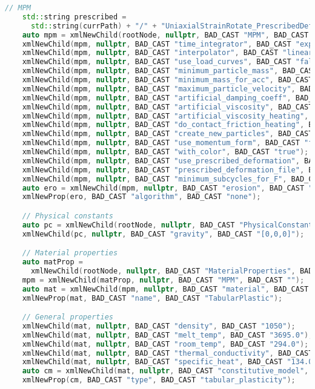 \begin{enumerate}
\begin{lstlisting}[language=Cpp]
    // MPM
    std::string prescribed = 
      std::string(currPath) + "/" + "UniaxialStrainRotate_PrescribedDeformation.inp";
    auto mpm = xmlNewChild(rootNode, nullptr, BAD_CAST "MPM", BAD_CAST "");
    xmlNewChild(mpm, nullptr, BAD_CAST "time_integrator", BAD_CAST "explicit");
    xmlNewChild(mpm, nullptr, BAD_CAST "interpolator", BAD_CAST "linear");
    xmlNewChild(mpm, nullptr, BAD_CAST "use_load_curves", BAD_CAST "false");
    xmlNewChild(mpm, nullptr, BAD_CAST "minimum_particle_mass", BAD_CAST "1.0e-15");
    xmlNewChild(mpm, nullptr, BAD_CAST "minimum_mass_for_acc", BAD_CAST "1.0e-15");
    xmlNewChild(mpm, nullptr, BAD_CAST "maximum_particle_velocity", BAD_CAST "1.0e5");
    xmlNewChild(mpm, nullptr, BAD_CAST "artificial_damping_coeff", BAD_CAST "0.0");
    xmlNewChild(mpm, nullptr, BAD_CAST "artificial_viscosity", BAD_CAST "true");
    xmlNewChild(mpm, nullptr, BAD_CAST "artificial_viscosity_heating", BAD_CAST "false");
    xmlNewChild(mpm, nullptr, BAD_CAST "do_contact_friction_heating", BAD_CAST "false");
    xmlNewChild(mpm, nullptr, BAD_CAST "create_new_particles", BAD_CAST "false");
    xmlNewChild(mpm, nullptr, BAD_CAST "use_momentum_form", BAD_CAST "false");
    xmlNewChild(mpm, nullptr, BAD_CAST "with_color", BAD_CAST "true");
    xmlNewChild(mpm, nullptr, BAD_CAST "use_prescribed_deformation", BAD_CAST "true");
    xmlNewChild(mpm, nullptr, BAD_CAST "prescribed_deformation_file", BAD_CAST prescribed.c_str());
    xmlNewChild(mpm, nullptr, BAD_CAST "minimum_subcycles_for_F", BAD_CAST "-2");
    auto ero = xmlNewChild(mpm, nullptr, BAD_CAST "erosion", BAD_CAST "");
    xmlNewProp(ero, BAD_CAST "algorithm", BAD_CAST "none");

    // Physical constants
    auto pc = xmlNewChild(rootNode, nullptr, BAD_CAST "PhysicalConstants", BAD_CAST "");
    xmlNewChild(pc, nullptr, BAD_CAST "gravity", BAD_CAST "[0,0,0]");

    // Material properties
    auto matProp = 
      xmlNewChild(rootNode, nullptr, BAD_CAST "MaterialProperties", BAD_CAST "");
    mpm = xmlNewChild(matProp, nullptr, BAD_CAST "MPM", BAD_CAST "");
    auto mat = xmlNewChild(mpm, nullptr, BAD_CAST "material", BAD_CAST "");
    xmlNewProp(mat, BAD_CAST "name", BAD_CAST "TabularPlastic");

    // General properties
    xmlNewChild(mat, nullptr, BAD_CAST "density", BAD_CAST "1050");
    xmlNewChild(mat, nullptr, BAD_CAST "melt_temp", BAD_CAST "3695.0");
    xmlNewChild(mat, nullptr, BAD_CAST "room_temp", BAD_CAST "294.0");
    xmlNewChild(mat, nullptr, BAD_CAST "thermal_conductivity", BAD_CAST "174.0e-7");
    xmlNewChild(mat, nullptr, BAD_CAST "specific_heat", BAD_CAST "134.0e-8");
    auto cm = xmlNewChild(mat, nullptr, BAD_CAST "constitutive_model", BAD_CAST "");
    xmlNewProp(cm, BAD_CAST "type", BAD_CAST "tabular_plasticity");


\end{lstlisting}
\end{enumerate}
